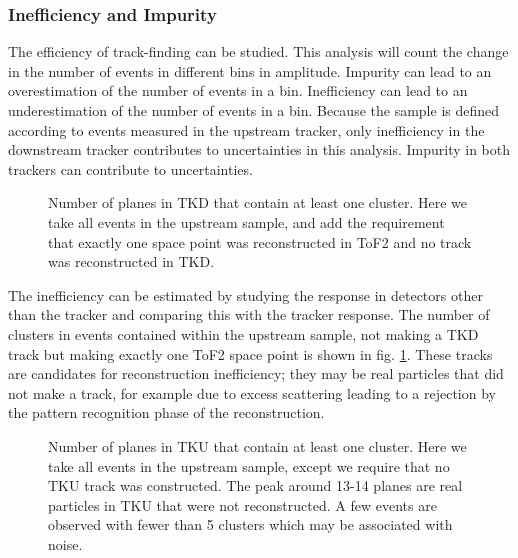 \subsubsection{Inefficiency and Impurity}

The efficiency of track-finding can be studied. This analysis will
count the change in the number of events in different bins in amplitude. 
Impurity can lead to an overestimation of the number of events in a bin. 
Inefficiency can lead to an underestimation of the number of events in a bin.
Because the sample is defined according to events measured in the upstream
tracker, only inefficiency in the downstream tracker contributes to 
uncertainties in this analysis. Impurity in both trackers can contribute to
uncertainties.

\begin{figure}[!tbh]
    \centering
    {Number of planes in TKD that contain at least one cluster. Here we 
    take all events in the upstream sample, and add the requirement that exactly 
    one space point was reconstructed in ToF2 and no track was reconstructed in 
    TKD. \label{fig:tkd_inefficient_tracks}}
\end{figure}

The inefficiency can be estimated by studying the response in detectors other 
than the tracker and comparing this with the tracker response. The number of
clusters in events contained within the upstream sample, not making a TKD track
but making exactly one ToF2 space point is shown in fig. 
\ref{fig:tkd_inefficient_tracks}. These tracks are candidates for reconstruction
inefficiency; they may be real particles that did not make a track, for example
due to excess scattering leading to a rejection by the pattern recognition phase 
of the reconstruction.

\begin{figure}[!tbh]
    \centering
    {Number of planes in TKU that contain at least one cluster. Here we 
    take all events in the upstream sample, except we require that no TKU track 
    was constructed. The peak around 13-14 planes are real particles in TKU that were 
    not reconstructed. A few events are observed with fewer than 5 clusters which
    may be associated with noise. \label{fig:tku_impure_tracks}}
\end{figure}


